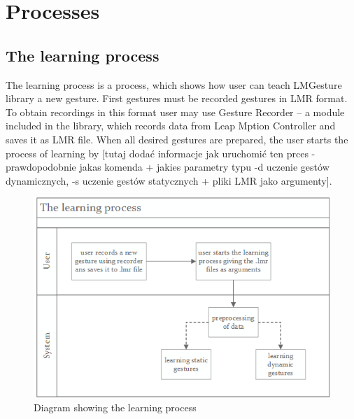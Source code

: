 \section{Processes}

\subsection{The learning process}
The learning process is a process, which shows how user can teach LMGesture library a new gesture. First  gestures must be recorded gestures in LMR format. To obtain recordings in this format user may use Gesture Recorder --  a module included in the library, which records data from Leap Mption Controller and saves it as LMR file. When all desired gestures are prepared, the user starts the process of learning by {\color{red}[tutaj dodać informacje jak uruchomić ten prces - prawdopodobnie jakas komenda + jakies parametry typu -d uczenie gestów dynamicznych, -s uczenie gestów statycznych + pliki LMR jako argumenty]}. 

\begin{figure}[htb]
\centering
 \includegraphics[width=0.75\columnwidth]{figures/learningProcess.png}
 \caption{Diagram showing the learning process}
 \label{learningprocess}
\end{figure}

